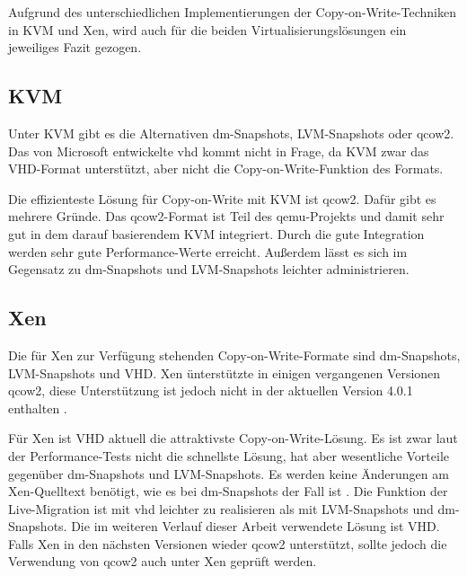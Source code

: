 Aufgrund des unterschiedlichen Implementierungen der Copy-on-Write-Techniken in KVM und Xen, wird auch für die beiden Virtualisierungslösungen ein jeweiliges Fazit gezogen.

\subsection{KVM}
Unter KVM gibt es die Alternativen dm-Snapshots, LVM-Snapshots oder qcow2. Das von Microsoft entwickelte vhd kommt nicht in Frage, da KVM zwar das VHD-Format unterstützt, aber nicht die Copy-on-Write-Funktion des Formats. 

Die effizienteste Lösung für Copy-on-Write mit KVM ist qcow2. Dafür gibt es mehrere Gründe. Das qcow2-Format ist Teil des qemu-Projekts und damit sehr gut in dem darauf basierendem KVM integriert. Durch die gute Integration werden sehr gute Performance-Werte erreicht. Außerdem lässt es sich im Gegensatz zu dm-Snapshots und LVM-Snapshots leichter administrieren.

\subsection{Xen}
Die für Xen zur Verfügung stehenden Copy-on-Write-Formate sind dm-Snapshots, LVM-Snapshots und VHD. Xen ünterstützte in einigen vergangenen Versionen qcow2, diese Unterstützung ist jedoch nicht in der aktuellen Version 4.0.1 enthalten \cite{qcow2support}. 

Für Xen ist VHD aktuell die attraktivste Copy-on-Write-Lösung. Es ist zwar laut der Performance-Tests nicht die schnellste Lösung, hat aber wesentliche Vorteile gegenüber dm-Snapshots und LVM-Snapshots. Es werden keine Änderungen am Xen-Quelltext benötigt, wie es bei dm-Snapshots der Fall ist \cite{racecondition}. Die Funktion der Live-Migration ist mit vhd leichter zu realisieren als mit LVM-Snapshots und dm-Snapshots. Die im weiteren Verlauf dieser Arbeit verwendete Lösung ist VHD. Falls Xen in den nächsten Versionen wieder qcow2 unterstützt, sollte jedoch die Verwendung von qcow2 auch unter Xen geprüft werden. 